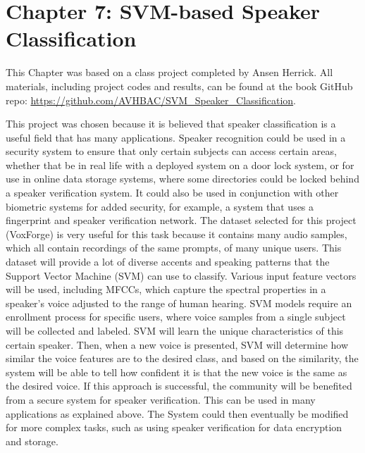 \documentclass[11pt,twoside,openany]{book}
\begin{document}
\setcounter{chapter}{6} %
\chapter{Chapter 7: SVM-based Speaker Classification}


This Chapter was based on a class project completed by Ansen Herrick. All materials, including project codes and results, can be found at the book GitHub repo: \url{https://github.com/AVHBAC/SVM_Speaker_Classification}.

This project was chosen because it is believed that speaker classification is a useful field that has many applications. Speaker recognition could be used in a security system to ensure that only certain subjects can access certain areas, whether that be in real life with a deployed system on a door lock system, or for use in online data storage systems, where some directories could be locked behind a speaker verification system. It could also be used in conjunction with other biometric systems for added security, for example, a system that uses a fingerprint and speaker verification network. The dataset selected for this project (VoxForge) is very useful for this task because it contains many audio samples, which all contain recordings of the same prompts, of many unique users. This dataset will provide a lot of diverse accents and speaking patterns that the Support Vector Machine (SVM) can use to classify. Various input feature vectors will be used, including MFCCs, which capture the spectral properties in a speaker's voice adjusted to the range of human hearing. SVM models require an enrollment process for specific users, where voice samples from a single subject will be collected and labeled. SVM will learn the unique characteristics of this certain speaker. Then, when a new voice is presented, SVM will determine how similar the voice features are to the desired class, and based on the similarity, the system will be able to tell how confident it is that the new voice is the same as the desired voice. If this approach is successful, the community will be benefited from a secure system for speaker verification. This can be used in many applications as explained above. The System could then eventually be modified for more complex tasks, such as using speaker verification for data encryption and storage.
\end{document}
